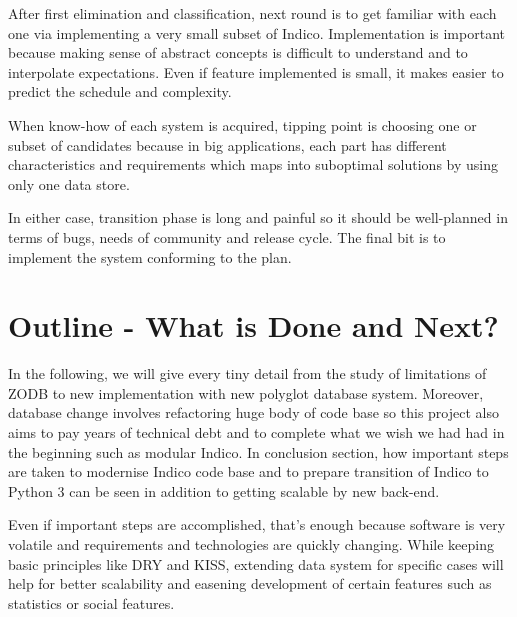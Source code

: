 \par After first elimination and classification, next round is to get familiar with each one via implementing a very small subset of Indico. Implementation is important because making sense of abstract concepts is difficult to understand and to interpolate expectations. Even if feature implemented is small, it makes easier  to predict the schedule and complexity.

\par When know-how of each system is acquired, tipping point is choosing one or subset of candidates because in big applications, each part has different characteristics and requirements which maps into suboptimal solutions by using only one data store.

\par In either case, transition phase is long and painful so it should be well-planned in terms of bugs, needs of community and release cycle. The final bit is to implement the system conforming to the plan.

\section{Outline - What is Done and Next?}

\par In the following, we will give every tiny detail from the study of limitations of ZODB to new implementation with new polyglot database system. Moreover, database change involves refactoring huge body of code base so this project also aims to pay years of technical debt and to complete what we wish we had had in the beginning such as modular Indico. In conclusion section, how important steps are taken to modernise Indico code base and to prepare transition of Indico to Python 3 can be seen in addition to getting scalable by new back-end.

\par Even if important steps are accomplished, that's enough because software is very volatile and requirements and technologies are quickly changing. While keeping basic principles like DRY and KISS, extending data system for specific cases will help for better scalability and easening development of certain features such as statistics or social features.

